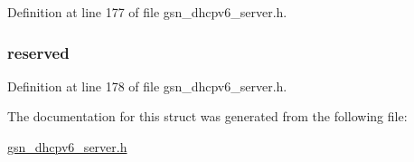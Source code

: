 Definition at line 177 of file gsn\_\-dhcpv6\_\-server.h.

\hypertarget{a00011_a61b1cfce69fc0011cd7b07b127a3f3f6}{
\subsubsection[{reserved}]{ {\bf reserved}}}
\label{a00011_a61b1cfce69fc0011cd7b07b127a3f3f6}


Definition at line 178 of file gsn\_\-dhcpv6\_\-server.h.



The documentation for this struct was generated from the following file:\begin{DoxyCompactItemize}
\item 
\hyperlink{a00483}{gsn\_\-dhcpv6\_\-server.h}\end{DoxyCompactItemize}
